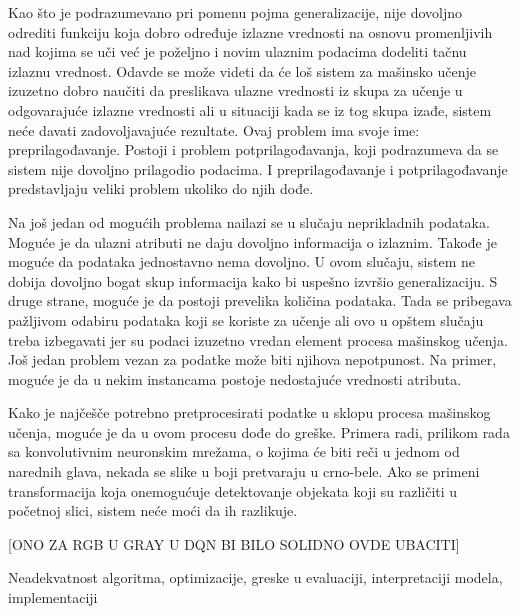 Kao što je podrazumevano pri pomenu pojma generalizacije, nije dovoljno odrediti funkciju koja dobro određuje izlazne vrednosti na osnovu promenljivih nad kojima se uči već je poželjno i novim ulaznim podacima dodeliti tačnu izlaznu vrednost. Odavde se može videti da će loš sistem za mašinsko učenje izuzetno dobro naučiti da preslikava ulazne vrednosti iz skupa za učenje u odgovarajuće izlazne vrednosti ali u situaciji kada se iz tog skupa izađe, sistem neće davati zadovoljavajuće rezultate. Ovaj problem ima svoje ime: preprilagođavanje. Postoji i problem potprilagođavanja, koji podrazumeva da se sistem nije dovoljno prilagodio podacima. I preprilagođavanje i potprilagođavanje predstavljaju veliki problem ukoliko do njih dođe. \par
Na još jedan od mogućih problema nailazi se u slučaju neprikladnih podataka. Moguće je da ulazni atributi ne daju dovoljno informacija o izlaznim. Takođe je moguće da podataka jednostavno nema dovoljno. U ovom slučaju, sistem ne dobija dovoljno bogat skup informacija kako bi uspešno izvršio generalizaciju. S druge strane, moguće je da postoji prevelika količina podataka. Tada se pribegava pažljivom odabiru podataka koji se koriste za učenje ali ovo u opštem slučaju  treba izbegavati jer su podaci izuzetno vredan element procesa mašinskog učenja. Još jedan problem vezan za podatke može biti njihova nepotpunost. Na primer, moguće je da u nekim instancama postoje nedostajuće vrednosti atributa. \par
Kako je najčešče potrebno pretprocesirati podatke u sklopu procesa mašinskog učenja, moguće je da u ovom procesu dođe do greške. Primera radi, prilikom rada sa konvolutivnim neuronskim mrežama, o kojima će biti reči u jednom od narednih glava, nekada se slike  u boji pretvaraju u crno-bele. Ako se primeni transformacija koja onemogućuje detektovanje objekata koji su različiti u početnoj slici, sistem neće moći da ih razlikuje. 


[ONO ZA RGB U GRAY U DQN BI BILO SOLIDNO OVDE UBACITI] \par
Neadekvatnost algoritma, optimizacije, greske u evaluaciji, interpretaciji modela, implementaciji